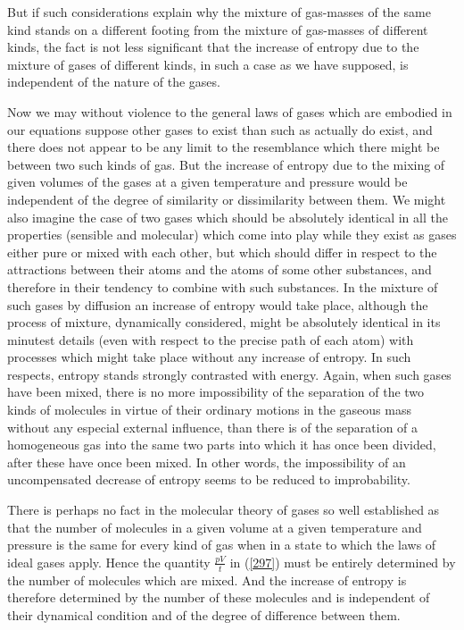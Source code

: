 \documentclass[12pt]{article}
\begin{document}
But if such considerations explain why the mixture of gas-masses of the same kind stands on a different footing from the mixture of gas-masses of different kinds, the fact is not less significant that the increase of entropy due to the mixture of gases of different kinds, in such a case as we have supposed, is independent of the nature of the gases.

Now we may without violence to the general laws of gases which are embodied in our equations suppose other gases to exist than such as actually do exist, and there does not appear to be any limit to the resemblance which there might be between two such kinds of gas. But the increase of entropy due to the mixing of given volumes of the gases at a given temperature and pressure would be independent of the degree of similarity or dissimilarity between them. We might also imagine the case of two gases which should be absolutely identical in all the properties (sensible and molecular) which come into play while they exist as gases either pure or mixed with each other, but which should differ in respect to the attractions between their atoms and the atoms of some other substances, and therefore in their tendency to combine with such substances. In the mixture of such gases by diffusion an increase of entropy would take place, although the process of mixture, dynamically considered, might be absolutely identical in its minutest details (even with respect to the precise path of each atom) with processes which might take place without any increase of entropy. In such respects, entropy stands strongly contrasted with energy. Again, when such gases have been mixed, there is no more impossibility of the separation of the two kinds of molecules in virtue of their ordinary motions in the gaseous mass without any especial external influence, than there is of the separation of a homogeneous gas into the same two parts into which it has once been divided, after these have once been mixed. In other words, the impossibility of an uncompensated decrease of entropy seems to be reduced to improbability. %


There is perhaps no fact in the molecular theory of gases so well established as that the number of molecules in a given volume at a given temperature and pressure is the same for every kind of gas when in a state to which the laws of ideal gases apply. Hence the quantity $\frac{pV}{t}$ in (\ref{297}) must be entirely determined by the number of molecules which are mixed. And the increase of entropy is therefore determined by the number of these molecules and is independent of their dynamical condition and of the degree of difference between them.
\end{document}
